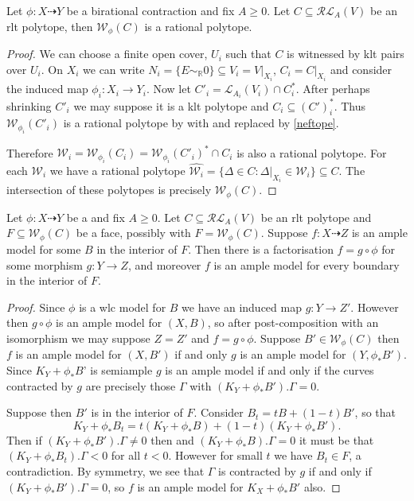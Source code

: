 \documentclass[a4paper,12pt]{amsart}
\begin{document}
	\begin{lemma}\label{rationality}
		Let $\phi: X \dashrightarrow Y$ be a birational contraction and fix $A \geq 0$. Let $C \subseteq \mathcal{RL}_{A}(V)$ be an rlt polytope, then $\mathcal{W}_{\phi}(C)$ is a rational polytope.
	\end{lemma}
	\begin{proof}
		We can choose a finite open cover, $U_{i}$ such that $C$ is witnessed by klt pairs over $U_{i}$. On $X_{i}$ we can write $N_{i}=\{E\sim_{\mathbb{R}} 0\} \subseteq V_{i}=V|_{X_{i}}$, $C_{i}=C|_{X_{i}}$ and consider the induced map $\phi_{i}:X_{i} \to Y_{i}$. Now let $C'_{i}=\mathcal{L}_{A_{i}}(V_{i}) \cap C_{i}^{*}$. After perhaps shrinking $C'_{i}$ we may suppose it is a klt polytope and $C_{i} \subseteq (C')^{*}_{i}$. Thus $\mathcal{W}_{\phi_{i}}(C'_{i})$ is a rational polytope by \cite[Corollary 3.11.2]{birkar2010existence} with \cite[Theorem 3.11.1]{birkar2010existence} and \cite[Lemma 3.7.4]{birkar2010existence} replaced by \autoref{neftope}.
		
		Therefore $\mathcal{W}_{i}=\mathcal{W}_{\phi_{i}}(C_{i})=\mathcal{W}_{\phi_{i}}(C'_{i})^{*}\cap C_{i}$ is also a rational polytope. For each $\mathcal{W}_{i}$ we have a rational polytope $\hat{\mathcal{W}_{i}}=\{\Delta \in C: \Delta|_{X_{i}} \in \mathcal{W}_{i}\} \subseteq C$. The intersection of these polytopes is precisely $\mathcal{W}_{\phi}(C)$.
	\end{proof}
	
	\begin{lemma}\label{faces}
		Let $\phi: X \dashrightarrow Y$ be a and fix $A \geq 0$. Let $C \subseteq \mathcal{RL}_{A}(V)$ be an rlt polytope and $F \subseteq \mathcal{W}_{\phi}(C)$ be a face, possibly with $F =\mathcal{W}_{\phi}(C)$. Suppose $f: X \dashrightarrow Z$ is an ample model for some $B$ in the interior of $F$. Then there is a factorisation $f=g \circ \phi$ for some morphism $g:Y \to Z$, and moreover $f$ is an ample model for every boundary in the interior of $F$.
	\end{lemma}
	
	\begin{proof}
		Since $\phi$ is a wlc model for $B$ we have an induced map $g: Y \to Z'$. However then $g\circ \phi$ is an ample model for $(X,B)$, so after post-composition with an isomorphism we may suppose $Z=Z'$ and $f=g\circ \phi$. Suppose $B' \in \mathcal{W}_{\phi}(C)$ then $f$ is an ample model for $(X,B')$ if and only $g$ is an ample model for $(Y,\phi_{*}B')$. Since $K_{Y}+\phi_{*}B$' is semiample $g$ is an ample model if and only if the curves contracted by $g$ are precisely those $\Gamma$ with $(K_{Y}+\phi_{*}B').\Gamma=0$.
		
		Suppose then $B'$ is in the interior of $F$. Consider $B_{t}=tB+(1-t)B'$, so that $$K_{Y}+\phi_{*}B_{t}= t(K_{Y}+\phi_{*}B)+(1-t)(K_{Y}+\phi_{*}B').$$ Then if $(K_{Y}+\phi_{*}B').\Gamma \neq 0$ then and $(K_{Y}+\phi_{*}B).\Gamma=0$ it must be that $(K_{Y}+\phi_{*}B_{t}).\Gamma < 0$ for all $t < 0$. However for small $t$ we have $B_{t} \in F$, a contradiction. By symmetry, we see that $\Gamma$ is contracted by $g$ if and only if $(K_{Y}+\phi_{*}B').\Gamma=0$, so $f$ is an ample model for $K_{X}+\phi_{*}B'$ also.
	\end{proof} 
\end{document}
